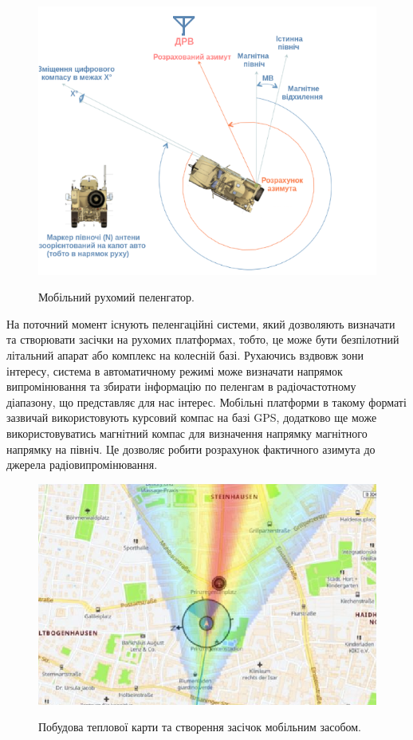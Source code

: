 \documentclass{article}
\begin{document}
\begin{figure}[H]
	\centering
	{\includegraphics[width=0.6\linewidth]{images/mobile_df.png}}
	\caption{\label{fig:triangulations} Мобільний рухомий пеленгатор.}
\end{figure}


На поточний момент існують пеленгаційні системи, який дозволяють визначати та створювати засічки на рухомих платформах, тобто, це може бути безпілотний літальний апарат або комплекс на колесній базі. Рухаючись вздвовж зони інтересу, система в автоматичному режимі може визначати напрямок випромінювання та збирати інформацію по пеленгам в радіочастотному діапазону, що представляє для нас інтерес. Мобільні платформи в такому форматі зазвичай використовують курсовий компас на базі GPS, додатково ще може використовуватись магнітний компас для визначення напрямку магнітного напрямку на північ. Це дозволяє робити розрахунок фактичного азимута до джерела радіовипромінювання. 

\begin{figure}[H]
	\centering
	{\includegraphics[width=0.6\linewidth]{images/heatmap-df.png}}
	\caption{\label{fig:triangulations} Побудова теплової карти та створення засічок мобільним засобом.}
\end{figure}
\end{document}
